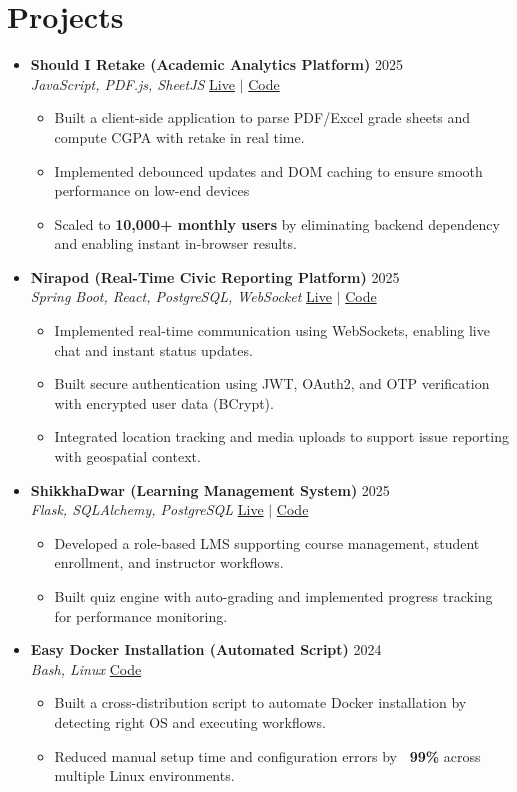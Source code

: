 \documentclass[a4paper,11pt]{article}
\newcommand{\resumeItem}[1]{
  \item\small{
    {#1 \vspace{-2pt}}
  }
}
\newcommand{\resumeItemListStart}{\begin{itemize}}
\newcommand{\resumeItemListEnd}{\end{itemize}\vspace{-5pt}}
\begin{document}
\section{Projects}
\begin{itemize}[leftmargin=0.15in, label={}, itemsep=6pt]

    \item
    \textbf{Should I Retake (Academic Analytics Platform)} \hfill 2025\\
    \small\textit{JavaScript, PDF.js, SheetJS} \hfill
    \href{https://badhon495.github.io/should-i-retake/}{Live} $|$
    \href{https://github.com/badhon495/should-i-retake}{Code}
    \vspace{-5pt}
    \resumeItemListStart
      \resumeItem{Built a client-side application to parse PDF/Excel grade sheets and compute CGPA with retake in real time.}
      \resumeItem{Implemented debounced updates and DOM caching to ensure smooth performance on low-end devices}
      \resumeItem{Scaled to \textbf{10,000+ monthly users} by eliminating backend dependency and enabling instant in-browser results.}
    \resumeItemListEnd

    \item
    \textbf{Nirapod (Real-Time Civic Reporting Platform)} \hfill 2025\\
    \small\textit{Spring Boot, React, PostgreSQL, WebSocket} \hfill
    \href{https://nirapod.netlify.app/}{Live} $|$
    \href{https://github.com/badhon495/Nirapod}{Code}
    \vspace{-5pt}
    \resumeItemListStart
      \resumeItem{Implemented real-time communication using WebSockets, enabling live chat and instant status updates.}
      \resumeItem{Built secure authentication using JWT, OAuth2, and OTP verification with encrypted user data (BCrypt).}
      \resumeItem{Integrated location tracking and media uploads to support issue reporting with geospatial context.}
    \resumeItemListEnd

    \item
    \textbf{ShikkhaDwar (Learning Management System)} \hfill 2025\\
    \small\textit{Flask, SQLAlchemy, PostgreSQL} \hfill
    \href{https://shikkhadwar-81r2.onrender.com/}{Live} $|$
    \href{https://github.com/nihal-kabir/ShikkhaDwar}{Code}
    \vspace{-5pt}
    \resumeItemListStart
      \resumeItem{Developed a role-based LMS supporting course management, student enrollment, and instructor workflows.}
      \resumeItem{Built quiz engine with auto-grading and implemented progress tracking for performance monitoring.}
    \resumeItemListEnd
    \item
    \textbf{Easy Docker Installation (Automated Script)} \hfill 2024\\
    \small\textit{Bash, Linux} \hfill
    \href{https://github.com/badhon495/Easy_Docker_Installation}{Code}
    \vspace{-5pt}
    \resumeItemListStart
      \resumeItem{Built a cross-distribution script to automate Docker installation by detecting right OS and executing workflows.}
      \resumeItem{Reduced manual setup time and configuration errors by \textbf{~99\%} across multiple Linux environments.}
    \resumeItemListEnd
    

\end{itemize}
\end{document}

